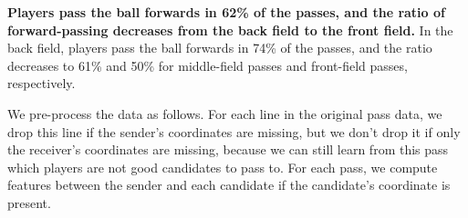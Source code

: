 \textbf{Players pass the ball forwards in 62\% of the passes, and the ratio of forward-passing decreases from the back field to the front field.} In the back field, players pass the ball forwards in 74\% of the passes, and the ratio decreases to 61\% and 50\% for middle-field passes and front-field passes, respectively.

We pre-process the data as follows. For each line in the original pass data, we drop this line if the sender's coordinates are missing, but we don't drop it if only the receiver's coordinates are missing, because we can still learn from this pass which players are not good candidates to pass to. For each pass, we compute features between the sender and each candidate if the candidate's coordinate is present.


